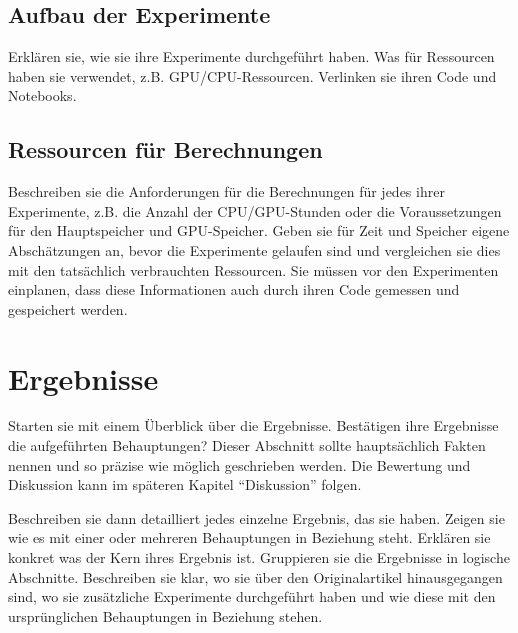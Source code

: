 \documentclass[DIV=13,fontsize=11pt]{scrartcl}
\begin{document}
\subsection{Aufbau der Experimente}
Erklären sie, wie sie ihre Experimente durchgeführt haben. Was für Ressourcen haben sie verwendet, z.B. GPU/CPU-Ressourcen.
Verlinken sie ihren Code und Notebooks.

\subsection{Ressourcen für Berechnungen}
Beschreiben sie die Anforderungen für die Berechnungen für jedes ihrer Experimente, z.B. die Anzahl der CPU/GPU-Stunden oder die Voraussetzungen für den Hauptspeicher und GPU-Speicher.
Geben sie für Zeit und Speicher eigene Abschätzungen an, bevor die Experimente gelaufen sind und vergleichen sie dies mit den tatsächlich verbrauchten Ressourcen.
Sie müssen vor den Experimenten einplanen, dass diese Informationen auch durch ihren Code gemessen und gespeichert werden.



\section{Ergebnisse}
Starten sie mit einem Überblick über die Ergebnisse.
Bestätigen ihre Ergebnisse die aufgeführten Behauptungen?
Dieser Abschnitt sollte hauptsächlich Fakten nennen und so präzise wie möglich geschrieben werden.
Die Bewertung und Diskussion kann im späteren Kapitel ``Diskussion'' folgen.


Beschreiben sie dann detailliert jedes einzelne Ergebnis, das sie haben.
Zeigen sie wie es mit einer oder mehreren Behauptungen in Beziehung steht.
Erklären sie konkret was der Kern ihres Ergebnis ist.
Gruppieren sie die Ergebnisse in logische Abschnitte.
Beschreiben sie klar, wo sie über den Originalartikel hinausgegangen sind, wo sie zusätzliche Experimente durchgeführt haben und wie diese mit den ursprünglichen Behauptungen in Beziehung stehen.
\end{document}
